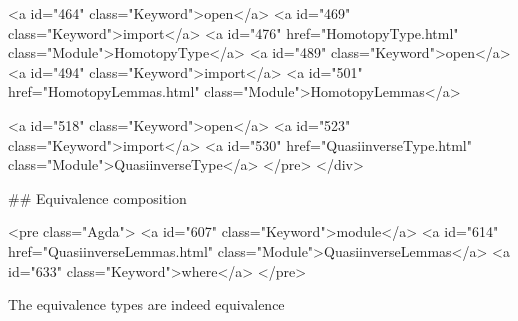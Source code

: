 <a id="464" class="Keyword">open</a> <a id="469" class="Keyword">import</a> <a id="476" href="HomotopyType.html" class="Module">HomotopyType</a>
<a id="489" class="Keyword">open</a> <a id="494" class="Keyword">import</a> <a id="501" href="HomotopyLemmas.html" class="Module">HomotopyLemmas</a>


<a id="518" class="Keyword">open</a> <a id="523" class="Keyword">import</a> <a id="530" href="QuasiinverseType.html" class="Module">QuasiinverseType</a>
</pre>
</div>

## Equivalence composition

<pre class="Agda">
<a id="607" class="Keyword">module</a> <a id="614" href="QuasiinverseLemmas.html" class="Module">QuasiinverseLemmas</a> <a id="633" class="Keyword">where</a>
</pre>

The equivalence types are indeed equivalence

